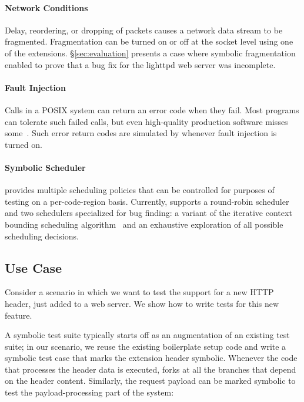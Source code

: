 \paragraph{Network Conditions} Delay, reordering, or dropping of packets causes a network data stream to be fragmented.  Fragmentation can be turned on or off at the socket level using one of the \cnine {} extensions.  \S\ref{sec:evaluation} presents a case where symbolic fragmentation enabled \cnine to prove that a bug fix for the lighttpd web server was incomplete. 

\paragraph{Fault Injection} Calls in a POSIX system can return an error code when they fail. Most programs can tolerate such failed calls, but even high-quality production software misses some~\cite{lfi}. Such error return codes are simulated by \cnine whenever fault injection is turned on. 

\paragraph{Symbolic Scheduler} \cnine provides multiple scheduling policies that can be controlled for purposes of testing on a per-code-region basis.  Currently, \cnine supports a round-robin scheduler and two schedulers specialized for bug finding: a variant of the iterative context bounding scheduling algorithm~\cite{chess} and an exhaustive exploration of all possible scheduling decisions.  


\subsection{Use Case}

Consider a scenario in which we want to test the support for a new  HTTP header, just added to a web server. We show how to write tests for this new feature. 

A symbolic test suite typically starts off as an augmentation of an existing test suite; in our scenario, we reuse the existing boilerplate setup code and write a symbolic test case that marks the extension header symbolic. Whenever the code that processes the header data is executed, \cnine forks at all the branches that depend on the header content. Similarly, the request payload can be marked symbolic to test the payload-processing part of the system:

